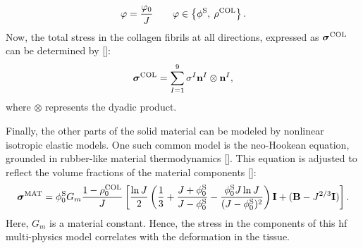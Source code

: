 %
\begin{equation}
    \label{continuity}
    \varphi = \frac{\varphi_0}{J} 
    \qquad 
    \varphi \in \left \{\phi^{\rm S}, \: \rho^{\rm COL} \right \}.
\end{equation}
%
Now, the total stress in the collagen fibrils at all directions, expressed as $\boldsymbol{\sigma}^{\rm COL}$ can be determined by [\cite{wilson2004a}]:
%
\begin{equation}\label{eq-fibril_stress}
    \boldsymbol{\sigma}^{\rm COL} = \sum_{I=1}^9 \sigma^I \mathbf{n}^I \otimes \mathbf{n}^I,
\end{equation}
%
where $\otimes$ represents the dyadic product.

Finally, the other parts of the solid material can be modeled by nonlinear isotropic elastic models. One such common model is the neo-Hookean equation, grounded in rubber-like material thermodynamics [\cite{kim2012}]. This equation is adjusted to reflect the volume fractions of the material components [\cite{wilson2007,sajjadinia2019}]:
%
\begin{equation}\label{eq-non_fibrillar}
    \boldsymbol{\sigma}^{\rm MAT} = 
    \phi^{\rm S}_0 G_m \frac{1 - \rho_0^{\rm COL}}{J} \left[\frac{\ln{J}}{2} 
    \left( \frac{1}{3} + \frac{J + \phi^{\rm S}_0}{J - \phi^{\rm S}_0} - \frac{\phi^{\rm S}_0 J\ln{J}}{( J - \phi^{\rm S}_0)^2} \right) \mathbf{I} 
    + (\mathbf{B} - J^{2/3}\mathbf{I}) \right].
\end{equation}
%
Here, \( G_m \) is a material constant. Hence, the stress in the components of this \ac{hf} multi-physics model correlates with the deformation in the tissue.

